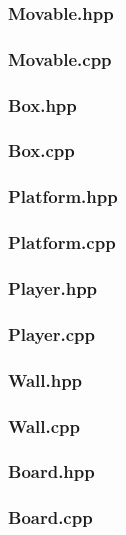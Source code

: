 \subsubsection{Movable.hpp}

\subsubsection{Movable.cpp}

\subsubsection{Box.hpp}

\subsubsection{Box.cpp}

\subsubsection{Platform.hpp}

\subsubsection{Platform.cpp}

\subsubsection{Player.hpp}

\subsubsection{Player.cpp}

\subsubsection{Wall.hpp}

\subsubsection{Wall.cpp}

\subsubsection{Board.hpp}

\subsubsection{Board.cpp}


